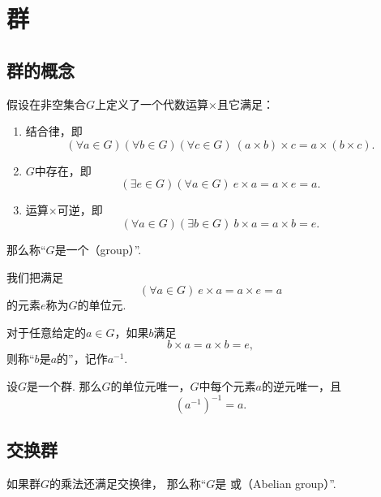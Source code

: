\section{群}
\subsection{群的概念}
\begin{definition}
假设在非空集合\(G\)上定义了一个代数运算\(\times\)且它满足：
\begin{enumerate}
    \item 结合律，即\[
        (\forall a \in G)(\forall b \in G)(\forall c \in G)\:
        (a \times b) \times c = a \times (b \times c).
    \]

    \item \(G\)中存在，即\[
        (\exists e \in G)(\forall a \in G)\:
        e \times a = a \times e = a.
    \]

    \item 运算\(\times\)可逆，即\[
        (\forall a \in G)(\exists b \in G)\:
        b \times a = a \times b = e.
    \]
\end{enumerate}
那么称“\(G\)是一个（group）”.
\end{definition}

\begin{definition}
我们把满足\[
    (\forall a \in G)\:
    e \times a = a \times e = a
\]的元素\(e\)称为\(G\)的单位元.
\end{definition}

\begin{definition}
对于任意给定的\(a \in G\)，如果\(b\)满足\[
    b \times a = a \times b = e,
\]
则称“\(b\)是\(a\)的”，记作\(a^{-1}\).
\end{definition}

\begin{property}
设\(G\)是一个群.
那么\(G\)的单位元唯一，\(G\)中每个元素\(a\)的逆元唯一，且\[
    (a^{-1})^{-1} = a.
\]
\end{property}

\subsection{交换群}
\begin{definition}
如果群\(G\)的乘法还满足交换律，
那么称“\(G\)是%
或（Abelian group）”.
\end{definition}
